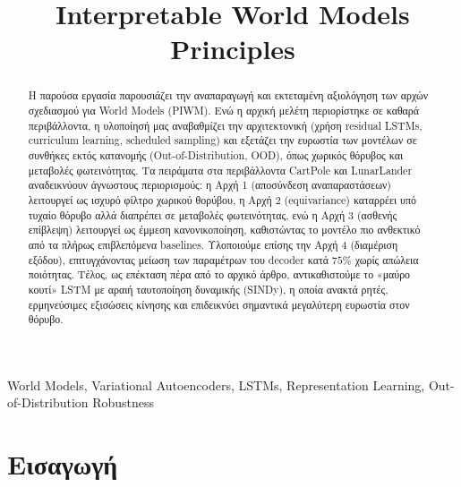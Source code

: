 \documentclass[conference, a4paper]{IEEEtran}
\begin{document}
\title{\textlatin{Interpretable World Models Principles}}

\author{
}

\maketitle

\begin{abstract}
Η παρούσα εργασία παρουσιάζει την αναπαραγωγή και εκτεταμένη αξιολόγηση των αρχών σχεδιασμού για \textlatin{World Models} (\textlatin{PIWM}). Ενώ η αρχική μελέτη περιορίστηκε σε καθαρά περιβάλλοντα, η υλοποίησή μας αναβαθμίζει την αρχιτεκτονική (χρήση \textlatin{residual LSTMs}, \textlatin{curriculum learning}, \textlatin{scheduled sampling}) και εξετάζει την ευρωστία των μοντέλων σε συνθήκες εκτός κατανομής (\textlatin{Out-of-Distribution}, \textlatin{OOD}), όπως χωρικός θόρυβος και μεταβολές φωτεινότητας. Τα πειράματα στα περιβάλλοντα \textlatin{CartPole} και \textlatin{LunarLander} αναδεικνύουν άγνωστους περιορισμούς: η Αρχή 1 (αποσύνδεση αναπαραστάσεων) λειτουργεί ως ισχυρό φίλτρο χωρικού θορύβου, η Αρχή 2 (\textlatin{equivariance}) καταρρέει υπό τυχαίο θόρυβο αλλά διαπρέπει σε μεταβολές φωτεινότητας, ενώ η Αρχή 3 (ασθενής επίβλεψη) λειτουργεί ως έμμεση κανονικοποίηση, καθιστώντας το μοντέλο πιο ανθεκτικό από τα πλήρως επιβλεπόμενα \textlatin{baselines}. Υλοποιούμε επίσης την Αρχή 4 (διαμέριση εξόδου), επιτυγχάνοντας μείωση των παραμέτρων του \textlatin{decoder} κατά $75\%$ χωρίς απώλεια ποιότητας. Τέλος, ως επέκταση πέρα από το αρχικό άρθρο, αντικαθιστούμε το «μαύρο κουτί» \textlatin{LSTM} με αραιή ταυτοποίηση δυναμικής (\textlatin{SINDy}), η οποία ανακτά ρητές, ερμηνεύσιμες εξισώσεις κίνησης και επιδεικνύει σημαντικά μεγαλύτερη ευρωστία στον θόρυβο.
\end{abstract}

\begin{IEEEkeywords}
\textlatin{World Models, Variational Autoencoders, LSTMs, Representation Learning, Out-of-Distribution Robustness}
\end{IEEEkeywords}

\section{\textbf{Εισαγωγή}}
\label{sec:intro}
\end{document}

